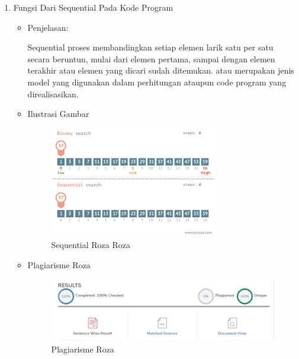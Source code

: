 \begin{enumerate}
\item Fungsi Dari Sequential Pada Kode Program
\begin{itemize}
\item Penjelasan:
\par Sequential proses membandingkan setiap elemen larik satu per satu secara beruntun, mulai dari elemen pertama, sampai dengan elemen terakhir atau elemen yang dicari sudah ditemukan. atau merupakan jenis model yang digunakan dalam perhitungan ataupun code program yang direalisasikan.
\par
\item Ilustrasi Gambar
\begin{figure}[!hbtp]
\centering
\includegraphics[scale=0.8]{figures/sequentialroza.png}
\caption{Sequential Roza Roza}
\label{text-fadila}
\end{figure}
\par
\end{itemize}
\par
\par

\begin{itemize}
\item Plagiarisme Roza
\begin{figure}[!hbtp]
\centering
\includegraphics[scale=0.5]{figures/plagiarisme.jpg}
\caption{Plagiarisme Roza}
\label{text-fadila}
\end{figure}
\end{itemize}

\end{enumerate}






